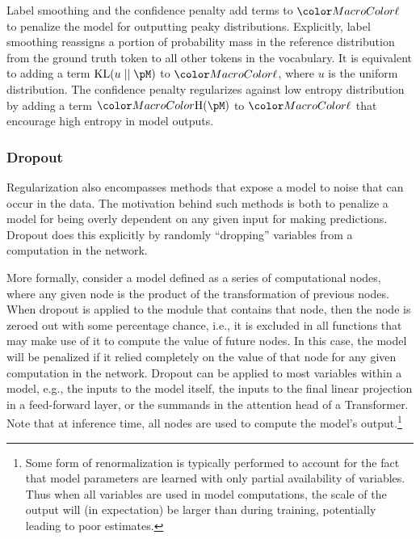 Label smoothing \citep{label_smoothing} and the confidence penalty \citep{confidence_penalty} add terms to $\loss$ to penalize the model for outputting peaky distributions. Explicitly, label smoothing reassigns a portion of probability mass in the reference distribution from the ground truth token to all other tokens in the vocabulary. It is equivalent to adding a term $\mathrm{KL}(u \mid\mid \pM)$ to $\loss$, where $u$ is the uniform distribution. The confidence penalty regularizes against low entropy distribution by adding a term $\ent(\pM)$ to $\loss$ that encourage high entropy in model outputs.


\subsubsection{Dropout}

Regularization also encompasses methods that expose a model to noise that can occur in the data. The motivation behind such methods is both to penalize a model for being overly dependent on any given input for making predictions. %
Dropout does this explicitly by randomly ``dropping''  variables from a computation in the network. 

More formally, consider a model defined as a series of computational nodes, where any given node is the product of the transformation of previous nodes. When dropout is applied to the module that contains that node, then the node is zeroed out with some percentage chance, i.e., it is excluded in all functions that may make use of it to compute the value of future nodes. In this case, the model will be penalized if it relied completely on the value of that node for any given computation in the network. Dropout can be applied to most variables within a model, e.g., the inputs to the model itself, the inputs to the final linear projection in a feed-forward layer, or the summands in the attention head of a Transformer. 
Note that at inference time, all nodes are used to compute the model's output.\footnote{Some form of renormalization is typically performed to account for the fact that model parameters are learned with only  partial availability of variables. Thus when all variables are used in model computations, the scale of the output will (in expectation) be larger than during training, potentially leading to poor estimates.}

